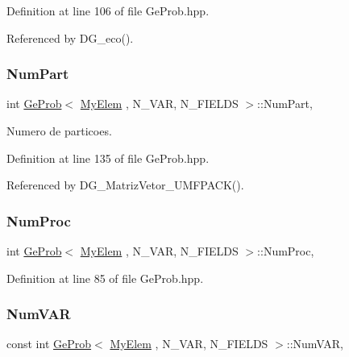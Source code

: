 Definition at line 106 of file Ge\+Prob.\+hpp.



Referenced by D\+G\+\_\+eco().

\mbox{\label{classGeProb_ab269c3e7eeb6ae7c5fd87ae54df757b2}} 
\subsubsection{\texorpdfstring{Num\+Part}{NumPart}}
{\footnotesize\ttfamily int \hyperlink{classGeProb}{Ge\+Prob}$<$ \hyperlink{DG__Prob_8h_a83cd887ced9a6587428f267e50cd4787}{My\+Elem} , N\+\_\+\+V\+AR, N\+\_\+\+F\+I\+E\+L\+DS $>$\+::Num\+Part\hspace{0.3cm}{\ttfamily [protected]}, {\ttfamily [inherited]}}



Numero de particoes. 



Definition at line 135 of file Ge\+Prob.\+hpp.



Referenced by D\+G\+\_\+\+Matriz\+Vetor\+\_\+\+U\+M\+F\+P\+A\+C\+K().

\mbox{\label{classGeProb_a8678d8a8dc17175ba98761beeccc0e04}} 
\subsubsection{\texorpdfstring{Num\+Proc}{NumProc}}
{\footnotesize\ttfamily int \hyperlink{classGeProb}{Ge\+Prob}$<$ \hyperlink{DG__Prob_8h_a83cd887ced9a6587428f267e50cd4787}{My\+Elem} , N\+\_\+\+V\+AR, N\+\_\+\+F\+I\+E\+L\+DS $>$\+::Num\+Proc\hspace{0.3cm}{\ttfamily [protected]}, {\ttfamily [inherited]}}



Definition at line 85 of file Ge\+Prob.\+hpp.

\mbox{\label{classGeProb_ac6d9c06150838e892ed3eaa1b60bac5d}} 
\subsubsection{\texorpdfstring{Num\+V\+AR}{NumVAR}}
{\footnotesize\ttfamily const int \hyperlink{classGeProb}{Ge\+Prob}$<$ \hyperlink{DG__Prob_8h_a83cd887ced9a6587428f267e50cd4787}{My\+Elem} , N\+\_\+\+V\+AR, N\+\_\+\+F\+I\+E\+L\+DS $>$\+::Num\+V\+AR\hspace{0.3cm}{\ttfamily [protected]}, {\ttfamily [inherited]}}



